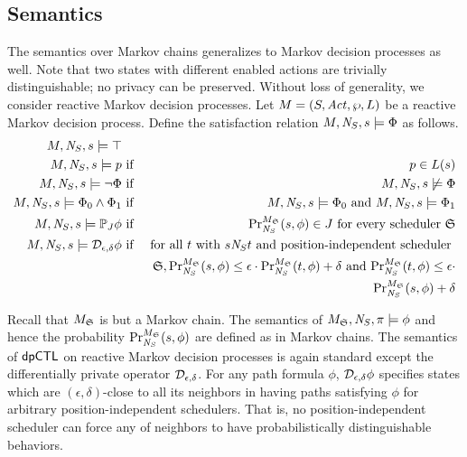 \subsection{Semantics}
The semantics over Markov chains generalizes to Markov decision
processes as well. Note that two states with different enabled actions
are trivially distinguishable; no privacy can be preserved. Without
loss of generality, we consider reactive Markov decision processes.
Let $M = (S, \Act, \wp, L)$ be a reactive Markov
decision process. Define the satisfaction
relation $M, \neighbor{S}, s \models \Phi$ as follows.
\begin{eqnarray*}
  M, \neighbor{S}, s \models \top\\
  M, \neighbor{S}, s \models p
  & \textmd{ if } &
  p \in L(s)\\
  M, \neighbor{S}, s \models \neg \Phi
  & \textmd{ if } &
  M, \neighbor{S}, s \not\models \Phi\\
  M, \neighbor{S}, s \models \Phi_0 \wedge \Phi_1
  & \textmd{ if } &
  M, \neighbor{S}, s \models \Phi_0 \textmd{ and }
  M, \neighbor{S}, s \models \Phi_1\\
  M, \neighbor{S}, s \models \PJ{J} \phi
  & \textmd{ if } &
  \myPr{s}{M_{\scheduler{S}}}{\neighbor{S}}{\phi} \in J
  \textmd{ for every scheduler } \scheduler{S}\\
  M, \neighbor{S}, s \models \dpriv{\epsilon}{\delta} \phi
  & \textmd{ if } &
  \textmd{for all } t \textmd{ with } s \neighbor{S} t \textmd{ and
   position-independent scheduler } \\
  & & \scheduler{S},
   \myPr{s}{M_{\scheduler{S}}}{\neighbor{S}}{\phi} \leq \epsilon \cdot
   \myPr{t}{M_{\scheduler{S}}}{\neighbor{S}}{\phi} + \delta
   \textmd{ and }
   \myPr{t}{M_{\scheduler{S}}}{\neighbor{S}}{\phi} \leq \epsilon \cdot
  \\
  & &
   \myPr{s}{M_{\scheduler{S}}}{\neighbor{S}}{\phi} + \delta
\end{eqnarray*}

Recall that $M_{\scheduler{S}}$ is but a Markov chain. The semantics
of $M_{\scheduler{S}}, \neighbor{S}, \pi \models \phi$ and hence the
probability $\myPr{s}{M_{\scheduler{S}}}{\neighbor{S}}{\phi}$ are
defined as in Markov chains.
The semantics of $\dpCTL$ on reactive Markov decision processes
is again standard except the differentially private operator
$\dpriv{\epsilon}{\delta}$. For any path formula $\phi$,
$\dpriv{\epsilon}{\delta} \phi$ specifies states which are $(\epsilon,
\delta)$-close to all its neighbors in having paths satisfying $\phi$
for arbitrary position-independent schedulers. That is, no
position-independent scheduler can force any of neighbors to have
probabilistically distinguishable behaviors.

